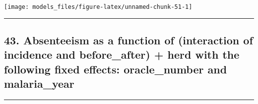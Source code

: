 \documentclass[]{article}
\begin{document}
\begin{center}\texttt{[image: models\_files/figure-latex/unnamed-chunk-51-1]} \end{center}

\newpage

\begin{center}\rule{0.5\linewidth}{\linethickness}\end{center}

\subsection{43. Absenteeism as a function of (interaction of incidence
and before\_after) + herd with the following fixed effects:
oracle\_number and
malaria\_year}\label{absenteeism-as-a-function-of-interaction-of-incidence-and-before_after-herd-with-the-following-fixed-effects-oracle_number-and-malaria_year}

\begin{center}\rule{0.5\linewidth}{\linethickness}\end{center}
\end{document}
